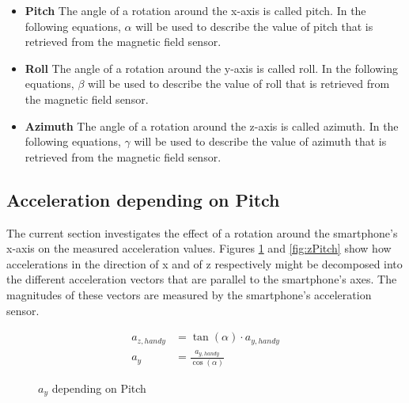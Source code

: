 \documentclass[12pt, a4paper, oneside, british]{article}
\begin{document}
\begin{itemize}
\item{
\textbf{Pitch} \newline
The angle of a rotation around the x-axis is called pitch. In the following
equations, $\alpha$ will be used to describe the value of pitch that is
retrieved from the magnetic field sensor.
}
\item{
\textbf{Roll} \newline
The angle of a rotation around the y-axis is called roll. In the following
equations, $\beta$ will be used to describe the value of roll that is retrieved
from the magnetic field sensor.
}
\item{
\textbf{Azimuth} \newline
The angle of a rotation around the z-axis is called azimuth. In the following
equations, $\gamma$ will be used to describe the value of azimuth that is
retrieved from the magnetic field sensor.
}
\end{itemize}


\subsection{Acceleration depending on Pitch}
The current section investigates the effect of a rotation around the
smartphone's x-axis on the measured acceleration values. Figures
\ref{fig:yPitch} and \ref{fig:zPitch} show how accelerations in the direction of
x and of z respectively might be decomposed into the different
acceleration vectors that are parallel to the smartphone's axes. The 
magnitudes of these vectors are measured by the smartphone's acceleration
sensor.

\begin{figure}[htb]
    \centering
    \begin{minipage}{0.5\textwidth}
        \centering
        \captionsetup{justification=centering}
        
        \caption{$a_y$ depending on Pitch}
        \label{fig:yPitch}
    \end{minipage}%
    \hfill
    \begin{minipage}{0.5\textwidth}
        \centering
			\begin{align} 
				a_{z, handy} &= \tan(\alpha) \cdot {a_{y, handy}}\\
				a_y &= \frac{a_{y, handy}}{\cos(\alpha)}
			\end{align}
    \end{minipage}
\end{figure}
\end{document}
